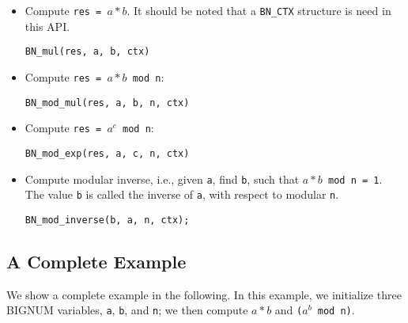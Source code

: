 \begin{itemize}
\item Compute \texttt{res = $a * b$}. It should be noted that a
\texttt{BN\_CTX} structure is need in this API.

\begin{lstlisting}
BN_mul(res, a, b, ctx)
\end{lstlisting}


\item Compute \texttt{res = $a * b$  mod n}:

\begin{lstlisting}
BN_mod_mul(res, a, b, n, ctx)
\end{lstlisting}



\item Compute \texttt{res = $a^c$ mod n}:

\begin{lstlisting}
BN_mod_exp(res, a, c, n, ctx)
\end{lstlisting}


\item Compute modular inverse, i.e., given \texttt{a}, find \texttt{b},
such that \texttt{$a * b$  mod n = 1}. The value \texttt{b} is called
the inverse of \texttt{a}, with respect to modular \texttt{n}.

\begin{lstlisting}
BN_mod_inverse(b, a, n, ctx);
\end{lstlisting}


\end{itemize}



\subsection{A Complete Example}

We show a complete example in the following. In this example, we
initialize three BIGNUM variables, \texttt{a}, \texttt{b}, and \texttt{n};
we then compute $a*b$ and \texttt{($a^b$ mod n)}.

